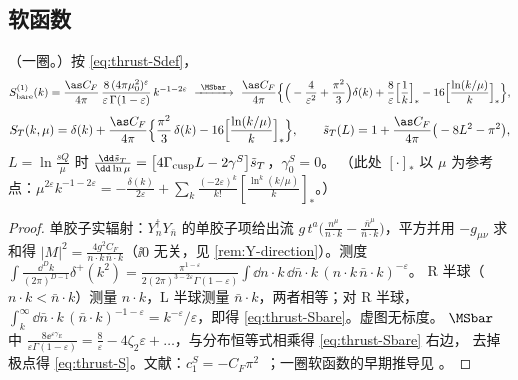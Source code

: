 \subsection{软函数}

\begin{proposition}[一圈推力软函数]\tagR\label{prop:thrust-soft}
（一圈。）按 \cref{eq:thrust-Sdef}，
\begin{equation}\label{eq:thrust-Sbare}
S^{(1)}_{\rm bare}(k)=\frac{\as C_F}{4\pi}\,\frac{8\,(4\pi\mu_0^2)^{\varepsilon}}{\varepsilon\,\Gamma(1-\varepsilon)}\,k^{-1-2\varepsilon}
\ \xrightarrow{\ \MSbar\ }\
\frac{\as C_F}{4\pi}\Big\{\Big(-\frac{4}{\varepsilon^2}+\frac{\pi^2}{3}\Big)\delta(k)+\frac{8}{\varepsilon}\Big[\frac1k\Big]_*-16\Big[\frac{\ln(k/\mu)}{k}\Big]_*\Big\},
\end{equation}
\begin{equation}\label{eq:thrust-S}
S_T(k,\mu)=\delta(k)+\frac{\as C_F}{4\pi}\Big\{\frac{\pi^2}{3}\,\delta(k)-16\Big[\frac{\ln(k/\mu)}{k}\Big]_*\Big\},\qquad
\tilde s_T(L)=1+\frac{\as C_F}{4\pi}\big(-8L^2-\pi^2\big),
\end{equation}
$L=\ln\frac{sQ}{\mu}$ 时 $\frac{\dd\tilde s_T}{\dd\ln\mu}=\big[4\Gamma_{\rm cusp}L-2\gamma^S\big]\tilde s_T$，$\gamma^S_0=0$。
（此处 $[\cdot]_*$ 以 $\mu$ 为参考点：$\mu^{2\varepsilon}k^{-1-2\varepsilon}=-\frac{\delta(k)}{2\varepsilon}+\sum_k\frac{(-2\varepsilon)^k}{k!}[\frac{\ln^k(k/\mu)}{k}]_*$。）
\end{proposition}

\begin{proof}
单胶子实辐射：$Y_n^\dagger Y_{\bar n}$ 的单胶子项给出流 $g\,t^a\big(\frac{n^\mu}{n\cdot k}-\frac{\bar n^\mu}{\bar n\cdot k}\big)$，平方并用 $-g_{\mu\nu}$
求和得 $|M|^2=\frac{4g^2C_F}{n\cdot k\,\bar n\cdot k}$（$\ii0$ 无关，见 \cref{rem:Y-direction}）。测度
$\int\frac{\dd^Dk}{(2\pi)^{D-1}}\delta^+(k^2)=\frac{\pi^{1-\varepsilon}}{2(2\pi)^{3-2\varepsilon}\Gamma(1-\varepsilon)}\int\dd n\cdot k\,\dd\bar n\cdot k\,(n\cdot k\,\bar n\cdot k)^{-\varepsilon}$。
R 半球（$n\cdot k<\bar n\cdot k$）测量 $n\cdot k$，L 半球测量 $\bar n\cdot k$，两者相等；对 R 半球，
$\int_k^\infty\dd\bar n\cdot k\,(\bar n\cdot k)^{-1-\varepsilon}=k^{-\varepsilon}/\varepsilon$，即得 \cref{eq:thrust-Sbare}。虚图无标度。
$\MSbar$ 中 $\frac{8\ee^{\varepsilon\gamma_E}}{\varepsilon\Gamma(1-\varepsilon)}=\frac8\varepsilon-4\zeta_2\varepsilon+\dots$，与分布恒等式相乘得 \cref{eq:thrust-Sbare} 右边，
去掉极点得 \cref{eq:thrust-S}。文献：$c_1^S=-C_F\pi^2$~\cite{BecherSchwartz2008}；一圈软函数的早期推导见 \cite{Schwartz2008,FlemingEtAl2008b}。
\end{proof}

